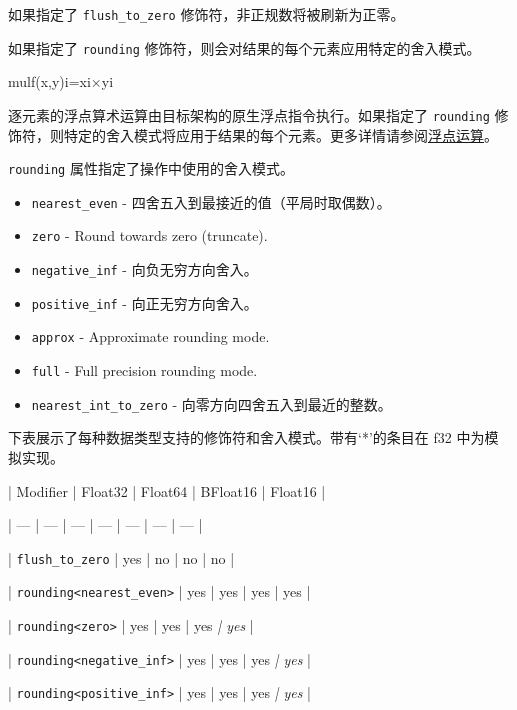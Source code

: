 \documentclass{article}
\begin{document}
如果指定了 \texttt{flush\_to\_zero} 修饰符，非正规数将被刷新为正零。



如果指定了 \texttt{rounding} 修饰符，则会对结果的每个元素应用特定的舍入模式。



mulf(x,y)i=xi×yi


逐元素的浮点算术运算由目标架构的原生浮点指令执行。如果指定了 \texttt{rounding} 修饰符，则特定的舍入模式将应用于结果的每个元素。更多详情请参阅\href{https://docs.nvidia.com/cuda/tile-ir/latest/sections/operations.html#op-group-floating-point}{浮点运算}。



\texttt{rounding} 属性指定了操作中使用的舍入模式。



\begin{itemize}
\item \texttt{nearest\_even} - 四舍五入到最接近的值（平局时取偶数）。
\item \texttt{zero} - Round towards zero (truncate).

\item \texttt{negative\_inf} - 向负无穷方向舍入。
\item \texttt{positive\_inf} - 向正无穷方向舍入。
\item \texttt{approx} - Approximate rounding mode.

\item \texttt{full} - Full precision rounding mode.

\item \texttt{nearest\_int\_to\_zero} - 向零方向四舍五入到最近的整数。


\end{itemize}
下表展示了每种数据类型支持的修饰符和舍入模式。带有`*'的条目在 f32 中为模拟实现。



| Modifier | Float32 | Float64 | BFloat16 | Float16 |


| --- | --- | --- | --- | --- | --- | --- |


| \texttt{flush\_to\_zero} | yes | no | no | no |


| \texttt{rounding<nearest\_even>} | yes | yes | yes | yes |


| \texttt{rounding<zero>} | yes | yes | yes\textit{ | yes} |


| \texttt{rounding<negative\_inf>} | yes | yes | yes\textit{ | yes} |


| \texttt{rounding<positive\_inf>} | yes | yes | yes\textit{ | yes} |
\end{document}
